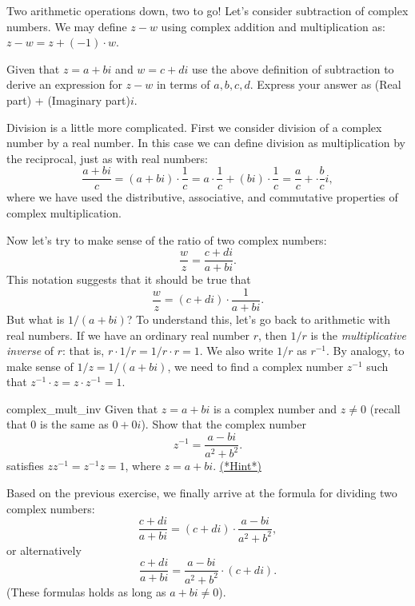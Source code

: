 Two arithmetic operations down, two to go!  Let's consider subtraction of complex numbers. We may define $z - w$ using complex addition and multiplication as:  $z - w = z + (-1)\cdot w$.

\begin{exercise}{}
 Given that  $z = a + bi$ and $w = c + di$ use the above definition of subtraction to derive an  expression for  $z - w$  in terms of $a,b,c,d$.  Express your answer as (Real part)  + (Imaginary part)$i$.
\end{exercise}

Division is a little more complicated. First we consider division of a complex number by a real number.  In this case we can define division as multiplication by the reciprocal, just as with real numbers:
\begin{equation*}\label{eq:complex:1}
\frac{a + bi}{c} = (a + bi) \cdot \frac{1}{c} = a \cdot \frac{1}{c} + (bi) \cdot \frac{1}{c} = \frac{a}{c} + \cdot \frac{b}{c}i , 
\end{equation*}
where we have used the distributive, associative, and commutative properties of complex multiplication. 

Now let's try to make sense of the ratio of two complex numbers: 
\[\frac{w}{z}=\frac{c+di} {a+bi}.\] 
This notation suggests that it should be true that  
\[\frac{w}{z}=(c+di)  \cdot \frac{1}{a+bi}. \]
 But what is $1/(a+bi)$?
To understand this, let's go back to arithmetic with real numbers. If we have an ordinary real number $r$, then $1/r$ is the \emph{multiplicative inverse} of $r$: that is, $r \cdot 1/r =1/r \cdot r = 1$. We also write $1/r$ as $r^{-1}$. By analogy, to make sense of $1/z = 1/(a+bi)$, we need to find a complex number $z^{-1}$ such that $z^{-1} \cdot z = z \cdot z^{-1} = 1$.

\begin{exercise}{complex_mult_inv}  Given that $z = a+bi$ is a complex number and $z \neq 0$ (recall that $0$ is the same as $0+0i$).  Show that the complex number
\[ z^{-1}=\frac{a-bi}{a^{2}+b^{2}}.\]
satisfies $zz^{-1}=z^{-1}z=1$, where $z=a+bi$.
\hyperref[sec:complex:hints]{(*Hint*)}
\end{exercise}
Based on the previous exercise, we finally arrive at the formula for dividing two complex numbers:
\[\frac{c+di}{a+bi}=
(c + di) \cdot \frac{a-bi}{a^2 + b^2}, \]
or alternatively
\[\frac{c+di}{a+bi}=  \frac{a-bi}{a^2 + b^2} \cdot (c + di).\]
(These formulas holds as long as $a+bi \neq 0$). 

